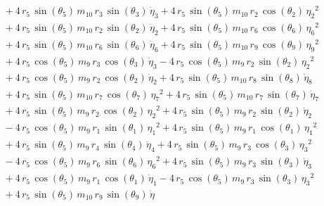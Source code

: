 \begin{eqnarray*}
 \\ &&\quad\mbox{} + 4\,r_{5}\,\sin({\theta_{5}})\,m_{10}\,r_{3}\,\sin
({\theta_{3}})\,{\dot{\eta}_{3}} + 4\,r_{5}\,\sin({\theta_{5}})\,m_{10
}\,r_{2}\,\cos({\theta_{2}})\,{{\eta_{2}}}^2 \\ &&\quad\mbox{} + 4\,r
_{5}\,\sin({\theta_{5}})\,m_{10}\,r_{2}\,\sin({\theta_{2}})\,{
\dot{\eta}_{2}} + 4\,r_{5}\,\sin({\theta_{5}})\,m_{10}\,r_{6}\,\cos({
\theta_{6}})\,{{\eta_{6}}}^2 \\ &&\quad\mbox{} + 4\,r_{5}\,\sin({
\theta_{5}})\,m_{10}\,r_{6}\,\sin({\theta_{6}})\,{\dot{\eta}_{6}} + 4
\,r_{5}\,\sin({\theta_{5}})\,m_{10}\,r_{9}\,\cos({\theta_{9}})\,{{\eta
_{9}}}^2 \\ &&\quad\mbox{} + 4\,r_{5}\,\cos({\theta_{5}})\,m_{9}\,r_{3
}\,\cos({\theta_{3}})\,{\dot{\eta}_{3}} - 4\,r_{5}\,\cos({\theta_{5}})
\,m_{9}\,r_{2}\,\sin({\theta_{2}})\,{{\eta_{2}}}^2 \\ &&\quad\mbox{}
 + 4\,r_{5}\,\cos({\theta_{5}})\,m_{9}\,r_{2}\,\cos({\theta_{2}})\,{
\dot{\eta}_{2}} + 4\,r_{5}\,\sin({\theta_{5}})\,m_{10}\,r_{8}\,\sin({
\theta_{8}})\,{\dot{\eta}_{8}} \\ &&\quad\mbox{} + 4\,r_{5}\,\sin({
\theta_{5}})\,m_{10}\,r_{7}\,\cos({\theta_{7}})\,{{\eta_{7}}}^2 + 4\,r
_{5}\,\sin({\theta_{5}})\,m_{10}\,r_{7}\,\sin({\theta_{7}})\,{
\dot{\eta}_{7}} \\ &&\quad\mbox{} + 4\,r_{5}\,\sin({\theta_{5}})\,m_{9
}\,r_{2}\,\cos({\theta_{2}})\,{{\eta_{2}}}^2 + 4\,r_{5}\,\sin({\theta
_{5}})\,m_{9}\,r_{2}\,\sin({\theta_{2}})\,{\dot{\eta}_{2}}
 \\ &&\quad\mbox{} - 4\,r_{5}\,\cos({\theta_{5}})\,m_{9}\,r_{1}\,\sin(
{\theta_{1}})\,{{\eta_{1}}}^2 + 4\,r_{5}\,\sin({\theta_{5}})\,m_{9}\,r
_{1}\,\cos({\theta_{1}})\,{{\eta_{1}}}^2 \\ &&\quad\mbox{} + 4\,r_{5}
\,\sin({\theta_{5}})\,m_{9}\,r_{4}\,\sin({\theta_{4}})\,{\dot{\eta}_{4
}} + 4\,r_{5}\,\sin({\theta_{5}})\,m_{9}\,r_{3}\,\cos({\theta_{3}})\,{
{\eta_{3}}}^2 \\ &&\quad\mbox{} - 4\,r_{5}\,\cos({\theta_{5}})\,m_{9}
\,r_{6}\,\sin({\theta_{6}})\,{{\eta_{6}}}^2 + 4\,r_{5}\,\sin({\theta_{
5}})\,m_{9}\,r_{3}\,\sin({\theta_{3}})\,{\dot{\eta}_{3}}
 \\ &&\quad\mbox{} + 4\,r_{5}\,\cos({\theta_{5}})\,m_{9}\,r_{1}\,\cos(
{\theta_{1}})\,{\dot{\eta}_{1}} - 4\,r_{5}\,\cos({\theta_{5}})\,m_{9}
\,r_{3}\,\sin({\theta_{3}})\,{{\eta_{3}}}^2 \\ &&\quad\mbox{} + 4\,r_{
5}\,\sin({\theta_{5}})\,m_{10}\,r_{9}\,\sin({\theta_{9}})\,{\dot{\eta}
}
\end{eqnarray*}
